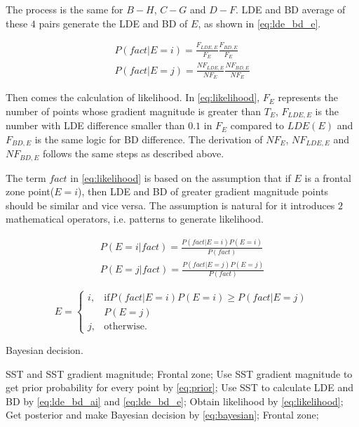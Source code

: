 The process is the same for $B-H$, $C-G$ and $D-F$. LDE and BD average of these $4$ pairs generate the LDE and BD of $E$, as shown in \eqref{eq:lde_bd_e}.

\begin{equation}\label{eq:likelihood}
	\begin{gathered}
		P(fact|E=i)=\frac{F_{LDE,E}}{F_{E}}\frac{F_{BD,E}}{F_{E}}\\
		P(fact|E=j)=\frac{NF_{LDE,E}}{NF_{E}}\frac{NF_{BD,E}}{NF_{E}}
	\end{gathered}
\end{equation}

Then comes the calculation of likelihood. In \eqref{eq:likelihood}, $F_E$ represents the number of points whose gradient magnitude is greater than $T_E$, $F_{LDE,E}$ is the number with LDE difference smaller than $0.1$ in $F_E$ compared to $LDE(E)$ and $F_{BD,E}$ is the same logic for BD difference. The derivation of $NF_E$, $NF_{LDE,E}$ and $NF_{BD,E}$ follows the same steps as described above.

The term $fact$ in \eqref{eq:likelihood} is based on the assumption that if $E$ is a frontal zone point($E=i$), then LDE and BD of greater gradient magnitude points should be similar and vice versa. The assumption is natural for it introduces $2$ mathematical operators, i.e. patterns to generate likelihood.

\begin{equation}\label{eq:bayesian}
	\begin{gathered}
		P(E=i|fact)=\frac{P(fact|E=i)P(E=i)}{P(fact)}\\
		P(E=j|fact)=\frac{P(fact|E=j)P(E=j)}{P(fact)}
	\end{gathered}
\end{equation}

\begin{equation}\label{eq:decision}
	{E} = \begin{cases}
		i,&{\text{if}}P(fact|E=i)P(E=i) \geq P(fact|E=j)\\
		&P(E=j)\\
		{j,}&{\text{otherwise.}} 
	\end{cases}
\end{equation}

\begin{algorithm}
	\caption{Bayesian decision.}
	\label{alg:bd}
	\begin{algorithmic}[1]
		\Require
		SST and SST gradient magnitude;
		\Ensure
		Frontal zone;
		\State Use SST gradient magnitude to get prior probability for every point by \eqref{eq:prior};
		\label{code:fram:prior}
		\State Use SST to calculate LDE and BD by \eqref{eq:lde_bd_ai} and \eqref{eq:lde_bd_e};
		\label{code:fram:lde_bd}
		\State Obtain likelihood by \eqref{eq:likelihood}; 
		\label{code:fram:likelihood}
		\State Get posterior and make Bayesian decision by \eqref{eq:bayesian};
		\label{code:fram:posterior}
		\Return Frontal zone;
	\end{algorithmic}
\end{algorithm}

